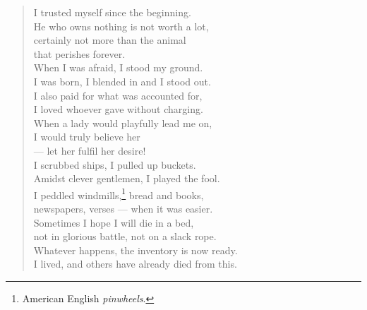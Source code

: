 \documentclass[11pt]{book}
\newcommand*{\centeredornament}{\centerline{\pgfornament[width=6cm]{88}}}
\begin{document}
\begin{verse}
  I trusted myself since the beginning. \\
  He who owns nothing is not worth a lot, \\
  certainly not more than the animal \\
  that perishes forever. \\
  When I was afraid, I stood my ground. \\
  I was born, I blended in and I stood out. \\
  I also paid for what was accounted for, \\
  I loved whoever gave without charging. \\
  When a lady would playfully lead me on, \\
  I would truly believe her \\
  --- let her fulfil her desire! \\
  I scrubbed ships, I pulled up buckets. \\
  Amidst clever gentlemen, I played the fool. \\
  I peddled windmills,\footnote{American English \emph{pinwheels}.} bread and books, \\
  newspapers, verses --- when it was easier. \\
  Sometimes I hope I will die in a bed, \\
  not in glorious battle, not on a slack rope. \\
  Whatever happens, the inventory is now ready.\hspace*{-1mm} \\
  I lived, and others have already died from this.\hspace*{-1mm}
\end{verse}

\newpage

\vspace*{-15mm}
\centeredornament


\end{document}
